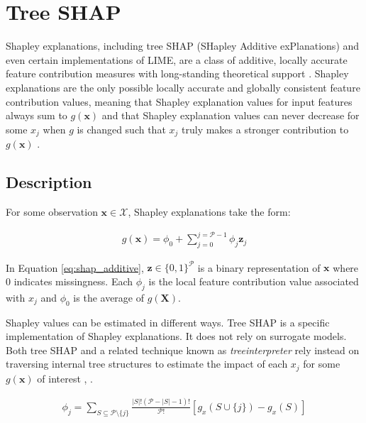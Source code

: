 \documentclass[sigconf, review]{acmart}
\begin{document}
\section{Tree SHAP} \label{sec:shap}

Shapley explanations, including tree SHAP (SHapley Additive exPlanations) and even certain implementations of LIME, are a class of additive, locally accurate feature contribution measures with long-standing theoretical support \cite{shapley}. Shapley explanations are the only possible locally accurate and globally consistent feature contribution values, meaning that Shapley explanation values for input features always sum to $g(\mathbf{x})$ and that Shapley explanation values can never decrease for some $x_j$ when $g$ is changed such that $x_j$ truly makes a stronger contribution to $g(\mathbf{x})$ \cite{shapley}. 

\subsection{Description}

For some observation $\mathbf{x} \in \mathcal{X}$, Shapley explanations take the form:

\begin{equation}
\label{eq:shap_additive}
\begin{aligned}
g(\mathbf{x}) = \phi_0 + \sum_{j=0}^{j=\mathcal{P} - 1} \phi_j \mathbf{z}_j
\end{aligned}
\end{equation}

\noindent In Equation \ref{eq:shap_additive}, $\mathbf{z} \in \{0,1\}^\mathcal{P}$ is a binary representation of $\mathbf{x}$ where 0 indicates missingness. Each $\phi_j$ is the local feature contribution value associated with $x_j$ and $\phi_0$ is the average of $g(\mathbf{X})$. 

Shapley values can be estimated in different ways. Tree SHAP is a specific implementation of Shapley explanations. It does not rely on surrogate models. Both tree SHAP and a related technique known as \textit{treeinterpreter} rely instead on traversing internal tree structures to estimate the impact of each $x_j$ for some $g(\mathbf{x})$ of interest \cite{tree_shap}, \cite{treeinterpreter}.

\begin{equation}
\label{eq:shap_contrib}
\begin{aligned}
\phi_{j} = \sum_{S \subseteq \mathcal{P} \setminus \{j\}}\frac{|S|!(\mathcal{P} -|S| -1)!}{\mathcal{P}!}[g_x(S \cup \{j\}) - g_x(S)]
\end{aligned}
\end{equation}
\end{document}

